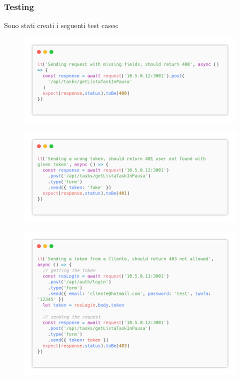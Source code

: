 \documentclass{report}
\begin{document}
\subsubsection*{Testing}

Sono stati creati i seguenti test cases:
\begin{figure}[H]
	\centering\includegraphics[width=1\textwidth]{images/code_in_pausa_test1.png}
\end{figure}
\begin{figure}[H]
	\centering\includegraphics[width=1\textwidth]{images/code_in_pausa_test2.png}
\end{figure}
\begin{figure}[H]
	\centering\includegraphics[width=1\textwidth]{images/code_in_pausa_test3.png}
\end{figure}
\end{document}
